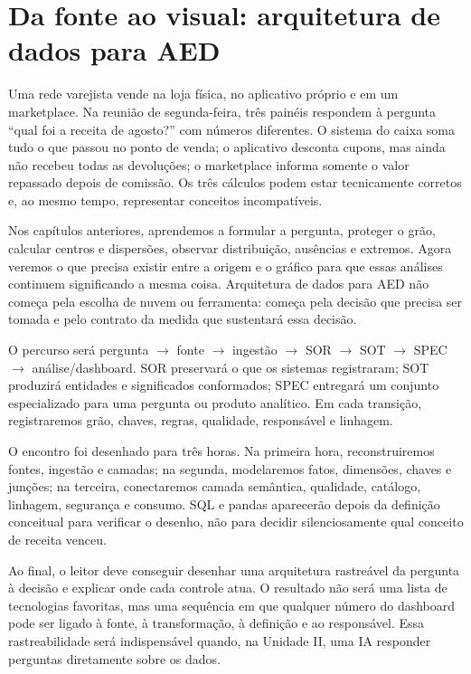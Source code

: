 \chapter[Da fonte ao visual]{Da fonte ao visual: arquitetura de dados para AED}

Uma rede varejista vende na loja física, no aplicativo próprio e em um marketplace. Na reunião de segunda-feira, três painéis respondem à pergunta ``qual foi a receita de agosto?'' com números diferentes. O sistema do caixa soma tudo o que passou no ponto de venda; o aplicativo desconta cupons, mas ainda não recebeu todas as devoluções; o marketplace informa somente o valor repassado depois de comissão. Os três cálculos podem estar tecnicamente corretos e, ao mesmo tempo, representar conceitos incompatíveis.

Nos capítulos anteriores, aprendemos a formular a pergunta, proteger o grão, calcular centros e dispersões, observar distribuição, ausências e extremos. Agora veremos o que precisa existir entre a origem e o gráfico para que essas análises continuem significando a mesma coisa. Arquitetura de dados para AED não começa pela escolha de nuvem ou ferramenta: começa pela decisão que precisa ser tomada e pelo contrato da medida que sustentará essa decisão.

O percurso será pergunta $\rightarrow$ fonte $\rightarrow$ ingestão $\rightarrow$ SOR $\rightarrow$ SOT $\rightarrow$ SPEC $\rightarrow$ análise/dashboard. SOR preservará o que os sistemas registraram; SOT produzirá entidades e significados conformados; SPEC entregará um conjunto especializado para uma pergunta ou produto analítico. Em cada transição, registraremos grão, chaves, regras, qualidade, responsável e linhagem.

O encontro foi desenhado para três horas. Na primeira hora, reconstruiremos fontes, ingestão e camadas; na segunda, modelaremos fatos, dimensões, chaves e junções; na terceira, conectaremos camada semântica, qualidade, catálogo, linhagem, segurança e consumo. SQL e pandas aparecerão depois da definição conceitual para verificar o desenho, não para decidir silenciosamente qual conceito de receita venceu.

Ao final, o leitor deve conseguir desenhar uma arquitetura rastreável da pergunta à decisão e explicar onde cada controle atua. O resultado não será uma lista de tecnologias favoritas, mas uma sequência em que qualquer número do dashboard pode ser ligado à fonte, à transformação, à definição e ao responsável. Essa rastreabilidade será indispensável quando, na Unidade II, uma IA responder perguntas diretamente sobre os dados.


